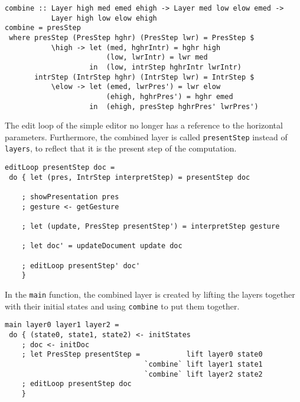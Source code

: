\begin{small}
\begin{verbatim}
combine :: Layer high med emed ehigh -> Layer med low elow emed -> 
           Layer high low elow ehigh
combine = presStep
 where presStep (PresStep hghr) (PresStep lwr) = PresStep $ 
           \high -> let (med, hghrIntr) = hghr high
                        (low, lwrIntr) = lwr med
                    in  (low, intrStep hghrIntr lwrIntr)
       intrStep (IntrStep hghr) (IntrStep lwr) = IntrStep $
           \elow -> let (emed, lwrPres') = lwr elow
                        (ehigh, hghrPres') = hghr emed
                    in  (ehigh, presStep hghrPres' lwrPres') 
\end{verbatim}
\end{small}


The edit loop of the simple editor no longer has a reference to the horizontal parameters. Furthermore, the combined layer is called \texttt{presentStep} instead of \texttt{layers}, to reflect that it is the present step of the computation.

\begin{small}
\begin{verbatim}
editLoop presentStep doc = 
 do { let (pres, IntrStep interpretStep) = presentStep doc

    ; showPresentation pres
    ; gesture <- getGesture
    
    ; let (update, PresStep presentStep') = interpretStep gesture
    
    ; let doc' = updateDocument update doc
    
    ; editLoop presentStep' doc'
    }
\end{verbatim}
\end{small}

In the \texttt{main} function, the combined layer is created by lifting the layers together with their initial states and using \texttt{combine} to put them together.

\begin{small}
\begin{verbatim}
main layer0 layer1 layer2 =
 do { (state0, state1, state2) <- initStates
    ; doc <- initDoc 
    ; let PresStep presentStep =           lift layer0 state0 
                                 `combine` lift layer1 state1
                                 `combine` lift layer2 state2
    ; editLoop presentStep doc
    }
\end{verbatim}
\end{small}


